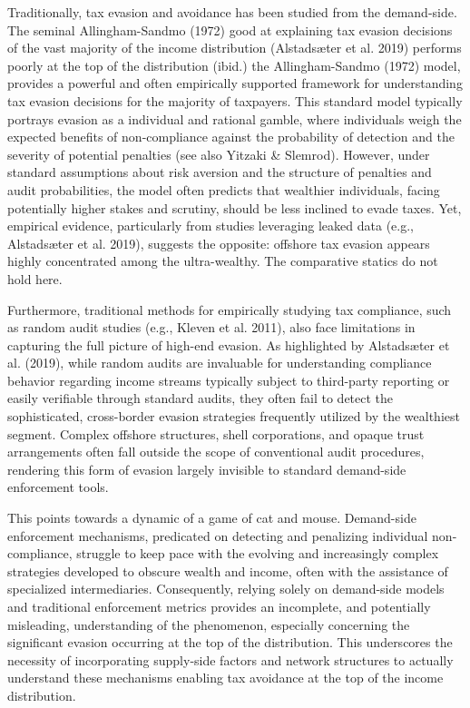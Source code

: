 Traditionally, tax evasion and avoidance has been studied from the demand-side. The seminal Allingham-Sandmo (1972) good at explaining tax evasion decisions of the vast majority of the income distribution (Alstadsæter et al. 2019) performs poorly at the top of the distribution (ibid.) the Allingham-Sandmo (1972) model, provides a powerful and often empirically supported framework for understanding tax evasion decisions for the majority of taxpayers. This standard model typically portrays evasion as a individual and rational gamble, where individuals weigh the expected benefits of non-compliance against the probability of detection and the severity of potential penalties (see also Yitzaki \& Slemrod). However, under standard assumptions about risk aversion and the structure of penalties and audit probabilities, the model often predicts that wealthier individuals, facing potentially higher stakes and scrutiny, should be less inclined to evade taxes. Yet, empirical evidence, particularly from studies leveraging leaked data (e.g., Alstadsæter et al. 2019), suggests the opposite: offshore tax evasion appears highly concentrated among the ultra-wealthy. The comparative statics do not hold here.

Furthermore, traditional methods for empirically studying tax compliance, such as random audit studies (e.g., Kleven et al. 2011), also face limitations in capturing the full picture of high-end evasion. As highlighted by Alstadsæter et al. (2019), while random audits are invaluable for understanding compliance behavior regarding income streams typically subject to third-party reporting or easily verifiable through standard audits, they often fail to detect the sophisticated, cross-border evasion strategies frequently utilized by the wealthiest segment. Complex offshore structures, shell corporations, and opaque trust arrangements often fall outside the scope of conventional audit procedures, rendering this form of evasion largely invisible to standard demand-side enforcement tools.

This points towards a dynamic of a game of cat and mouse. Demand-side enforcement mechanisms, predicated on detecting and penalizing individual non-compliance, struggle to keep pace with the evolving and increasingly complex strategies developed to obscure wealth and income, often with the assistance of specialized intermediaries. Consequently, relying solely on demand-side models and traditional enforcement metrics provides an incomplete, and potentially misleading, understanding of the phenomenon, especially concerning the significant evasion occurring at the top of the distribution. This underscores the necessity of incorporating supply-side factors and network structures to actually understand these mechanisms enabling tax avoidance at the top of the income distribution.

